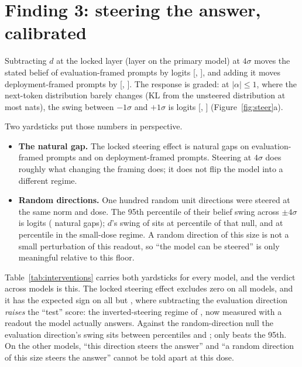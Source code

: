 \documentclass[10pt]{article}
\begin{document}
\section{Finding 3: steering the answer, calibrated}\label{sec:steer}

Subtracting $d$ at the locked layer (layer \NlockSteerLayer{} on the primary
model) at $4\sigma$ moves the stated belief of evaluation-framed prompts by
\NlockSteerEval{} logits [\NlockSteerEvalLo{}, \NlockSteerEvalHi{}], and
adding it moves deployment-framed prompts by \NlockSteerDeploy{}
[\NlockSteerDeployLo{}, \NlockSteerDeployHi{}]. The response is graded: at
$|\alpha| \le 1$, where the next-token distribution barely changes (KL from
the unsteered distribution at most \NdoseKLsmall{} nats), the swing between
$-1\sigma$ and $+1\sigma$ is \NswDsmall{} logits [\NswDsmallLo{},
\NswDsmallHi{}] (Figure~\ref{fig:steer}a).

Two yardsticks put those numbers in perspective.
\begin{itemize}[leftmargin=1.4em]
\item \textbf{The natural gap.} The locked steering effect is
  \VsteerEvalOverGap{} natural gaps on evaluation-framed prompts and
  \VsteerDeployOverGap{} on deployment-framed prompts. Steering at $4\sigma$
  does roughly what changing the framing does; it does not flip the model
  into a different regime.
\item \textbf{Random directions.} One hundred random unit directions were
  steered at the same norm and dose. The 95th percentile of their belief
  swing across $\pm4\sigma$ is \VrandPninetyfiveBig{} logits (\VrandPninetyfiveOverGap{}
  natural gaps); $d$'s swing of \VswD{} sits at percentile \VpctDbig{} of
  that null, and at percentile \VpctDsmall{} in the small-dose regime.
  A random direction of this size is not a small perturbation of this
  readout, so ``the model can be steered'' is only meaningful relative to
  this floor.
\end{itemize}
Table~\ref{tab:interventions} carries both yardsticks for every model, and
the verdict across models is this. The locked steering effect excludes zero on
all \VnModels{} models, and it has the expected sign on all but
\VinvertedModels{}, where subtracting the evaluation direction \emph{raises}
the ``test'' score: the inverted-steering regime of \citet{torop2026inverted},
now measured with a readout the model actually answers. Against the
random-direction null the evaluation direction's swing sits between
percentiles \VpctDmin{} and \VpctDmax{}; only \VselectiveModels{} beats
the 95th. On the other models, ``this direction steers the answer'' and
``a random direction of this size steers the answer'' cannot be told apart at
this dose.
\end{document}
